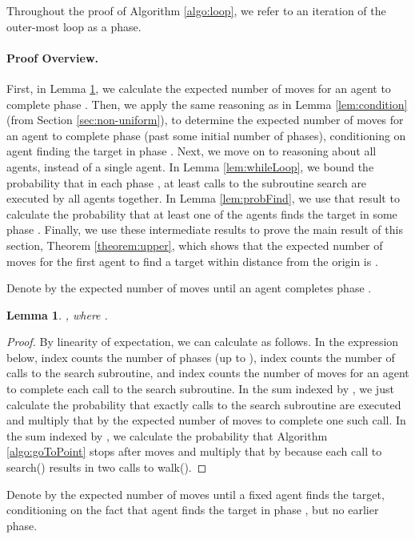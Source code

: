 \documentclass[11pt]{article}
\newtheorem{lemma}[theorem]{Lemma}
\begin{document}
Throughout the proof of Algorithm \ref{algo:loop}, we refer to an iteration of the outer-most loop as a phase. 

\paragraph{Proof Overview.} First, in Lemma \ref{lem:exp_i}, we calculate the expected number of moves  for an agent to complete phase . Then, we apply the same reasoning as in Lemma \ref{lem:condition} (from Section \ref{sec:non-uniform}), to determine the expected number of  moves  for an agent  to complete phase  (past some initial number of  phases), conditioning on agent  finding the target in phase . Next, we move on to reasoning about all  agents, instead of a single agent. In Lemma \ref{lem:whileLoop}, we bound the probability that in each phase , at least  calls to the subroutine search are executed by all agents together. In Lemma \ref{lem:probFind}, we use that result to calculate the probability that at least one of the  agents finds the target in some phase . Finally, we use these intermediate results to prove the main result of this section, Theorem \ref{theorem:upper}, which shows that the expected number of moves for the first agent to find a target within distance  from the origin is .

Denote by  the expected number of moves until an agent completes phase . 

\begin{lemma}\label{lem:exp_i}
, where .
\end{lemma}
\begin{proof}
By linearity of expectation, we can calculate  as follows. In the expression below, index  counts the number of phases (up to ), index  counts the number of calls to the search subroutine, and index  counts the number of moves for an agent to complete each call to the search subroutine. In the sum indexed by , we just calculate the probability that exactly  calls to the search subroutine are executed and multiply that by the expected number of moves to complete one such call. In the sum indexed by , we calculate the probability that Algorithm \ref{algo:goToPoint} stops after  moves and multiply that by  because  each call to search() results in two calls to walk(). 

\end{proof}

Denote by  the expected number of moves until a fixed agent  finds the target, conditioning on the fact that agent  finds the target in phase , but no earlier phase.
\end{document}
